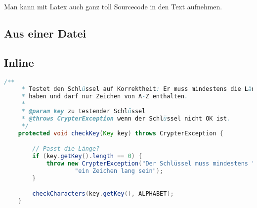 Man kann mit Latex auch ganz toll Sourcecode in den Text aufnehmen.

\subsection{Aus einer Datei}




\subsection{Inline}

\begin{lstlisting}[language=Java,caption=Methode checkKey()]
    /**
     * Testet den Schlüssel auf Korrektheit: Er muss mindestens die Länge 1
     * haben und darf nur Zeichen von A-Z enthalten.
     *
     * @param key zu testender Schlüssel
     * @throws CrypterException wenn der Schlüssel nicht OK ist.
     */
    protected void checkKey(Key key) throws CrypterException {

        // Passt die Länge?
        if (key.getKey().length == 0) {
            throw new CrypterException("Der Schlüssel muss mindestens " +
                    "ein Zeichen lang sein");
        }

        checkCharacters(key.getKey(), ALPHABET);
    }
\end{lstlisting}

